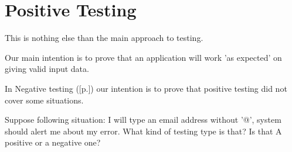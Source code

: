 \section{Positive Testing}
\label{sec:Positive Testing}

This is nothing else than the main approach to testing.

Our main intention is to prove that an application will work 'as expected' on giving valid input data.

In Negative testing ([p.\pageref{sec:Negative Testing}]) our intention is to prove that positive testing did not cover some situations.

Suppose following situation: I will type an email address without '@', system should alert me about my error. What kind of testing type is that? Is that A positive or a negative one?
